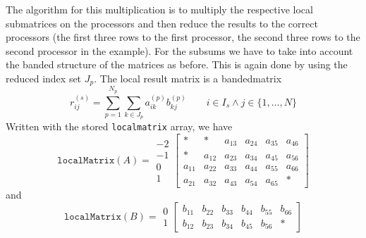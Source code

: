 The algorithm for this multiplication is to multiply the respective
local submatrices on the processors and then reduce the results to the
correct processors (the first three rows to the first processor, the
second three rows to the second processor in the example). For the
subsums we have to take into account the banded structure of the
matrices as before. This is again done by using the reduced index set
$J_p$. The local result matrix is a bandedmatrix 
\begin{equation}
  \label{eq:distr_mat}
  r_{ij}^{(s)}=\sum_{p=1}^{N_p}\sum_{k\in J_p} a_{ik}^{(p)}
  b_{kj}^{(p)}\qquad i\in I_s \wedge j\in\{1,\ldots,N\}
\end{equation}
Written with the stored \texttt{localmatrix} array, we have
\begin{displaymath}
  \mathtt{localMatrix}(A)=  \begin{array}{c}
    -2\\
    -1\\
    0\\
    1
  \end{array}
\left[
  \begin{array}{ccc|ccc}
    * & * & a_{13} &  a_{24} & a_{35} & a_{46} \\
    * & a_{12} & a_{23} & a_{34} & a_{45} & a_{56} \\
    a_{11} & a_{22} & a_{33} & a_{44} & a_{55} & a_{66} \\
    a_{21} & a_{32} & a_{43} & a_{54} & a_{65} & * 
  \end{array}
\right]
\end{displaymath}
and
\begin{displaymath}
  \mathtt{localMatrix}(B)=  \begin{array}{c}
    0\\
    1
  \end{array}
\left[
  \begin{array}{ccc|ccc}
    b_{11} & b_{22} & b_{33} & b_{44} & b_{55} & b_{66} \\
    b_{12} & b_{23} & b_{34} & b_{45} & b_{56} & * 
  \end{array}
\right]
\end{displaymath}

